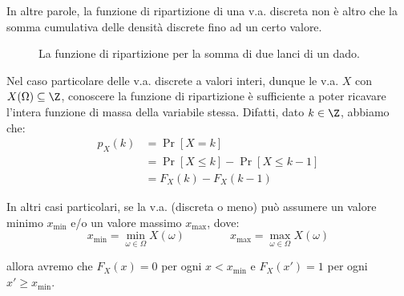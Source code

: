 \documentclass[a4paper, 12pt]{report}
\begin{document}
    In altre parole, la funzione di ripartizione di una v.a. discreta non è altro che la somma cumulativa delle densità discrete fino ad un certo valore.

    \begin{figure}[H]
        \centering

        \caption{La funzione di ripartizione per la somma di due lanci di un dado.}
    \end{figure}

    Nel caso particolare delle v.a. discrete a valori interi, dunque le v.a. $X$ con $X(\Omega) \subseteq \Z$, conoscere la funzione di ripartizione è sufficiente a poter ricavare l'intera funzione di massa della variabile stessa. Difatti, dato $k \in \Z$, abbiamo che:
    \[\begin{split}
        p_X(k) &= \Pr[X = k] \\
        &= \Pr[X \leq k] - \Pr[X \leq k-1] \\
        &= F_X(k) - F_X(k-1) 
    \end{split}\]

    In altri casi particolari, se la v.a. (discreta o meno) può assumere un valore minimo $x_{\min}$ e/o un valore massimo $x_{\max}$, dove:
    \[x_{\min} = \min_{\omega \in \Omega} X(\omega) \qquad\qquad x_{\max} = \max_{\omega \in \Omega} X(\omega)\]

    allora avremo che $F_X(x) = 0$ per ogni $x < x_{\min}$ e $F_X(x') = 1$ per ogni $x' \geq x_{\min}$.
\end{document}

